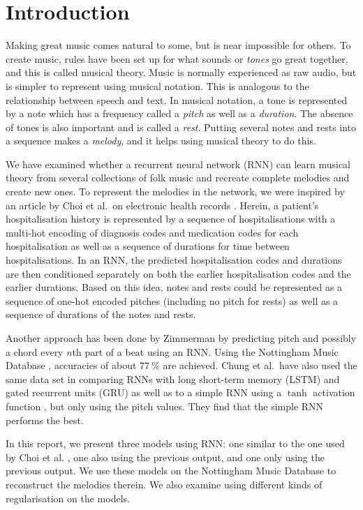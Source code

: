 \section{Introduction}
\label{sec:introduction}

Making great music comes natural to some, but is near impossible for others.
To create music, rules have been set up for what sounds or \emph{tones} go great together, and this is called musical theory.
Music is normally experienced as raw audio, but is simpler to represent using musical notation.
This is analogous to the relationship between speech and text.
In musical notation, a tone is represented by a note which has a frequency called a \emph{pitch} as well as a \emph{duration}.
The absence of tones is also important and is called a \emph{rest}.
Putting several notes and rests into a sequence makes a \emph{melody}, and it helps using musical theory to do this.

We have examined whether a recurrent neural network (RNN) can learn musical theory from several collections of folk music and recreate complete melodies and create new ones.
To represent the melodies in the network, we were inspired by an article by Choi et al.\ on electronic health records \cite{Choi2015}. Herein, a patient's hospitalisation history is represented by a sequence of hospitalisations with a multi-hot encoding of diagnosis codes and medication codes for each hospitalisation as well as a sequence of durations for time between hospitalisations.
In an RNN, the predicted hospitalisation codes and durations are then conditioned separately on both the earlier hospitalisation codes and the earlier durations.
Based on this idea, notes and rests could be represented as a sequence of one-hot encoded pitches (including no pitch for rests) as well as a sequence of durations of the notes and rests.

Another approach has been done by Zimmerman \cite{Zimmerman2016} by predicting pitch and possibly a chord every $n$th part of a beat using an RNN.
Using the Nottingham Music Database \cite{NMD}, accuracies of about $\SI{77}{\%}$ are achieved.
Chung et al.\ have also used the same data set in comparing RNNs with long short-term memory (LSTM) and gated recurrent units (GRU) as well as to a simple RNN using a $\tanh$ activation function \cite{Chung2014}, but only using the pitch values.
They find that the simple RNN performs the best.

In this report, we present three models using RNN: one similar to the one used by Choi et al. \cite{Choi2015}, one also using the previous output, and one only using the previous output.
We use these models on the Nottingham Music Database to reconstruct the melodies therein.
We also examine using different kinds of regularisation on the models.
